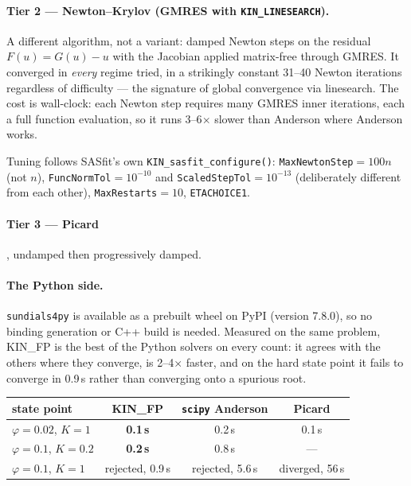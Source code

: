 \documentclass[11pt,a4paper]{article}
\newcommand{\code}[1]{\texttt{#1}}
\begin{document}
\paragraph{Tier 2 --- Newton--Krylov (GMRES with \code{KIN\_LINESEARCH}).}
A different algorithm, not a variant: damped Newton steps on the residual
$F(u)=G(u)-u$ with the Jacobian applied matrix-free through GMRES. It
converged in \emph{every} regime tried, in a strikingly constant 31--40
Newton iterations regardless of difficulty --- the signature of global
convergence via linesearch. The cost is wall-clock: each Newton step requires
many GMRES inner iterations, each a full function evaluation, so it runs
3--6$\times$ slower than Anderson where Anderson works.

Tuning follows SASfit's own \code{KIN\_sasfit\_configure()}:
\code{MaxNewtonStep}$=100n$ (not $n$), \code{FuncNormTol}$=10^{-10}$ and
\code{ScaledStepTol}$=10^{-13}$ (deliberately different from each other),
\code{MaxRestarts}$=10$, \code{ETACHOICE1}.

\paragraph{Tier 3 --- Picard}, undamped then progressively damped.

\paragraph{The Python side.} \code{sundials4py} is available as a prebuilt
wheel on PyPI (version 7.8.0), so no binding generation or C++ build is
needed. Measured on the same problem, KIN\_FP is the best of the Python
solvers on every count: it agrees with the others where they converge, is
2--4$\times$ faster, and on the hard state point it fails to converge in
0.9\,s rather than converging onto a spurious root.

\begin{center}
\begin{tabular}{lccc}
\toprule
state point & KIN\_FP & \code{scipy} Anderson & Picard\\
\midrule
$\varphi=0.02$, $K=1$ & \textbf{0.1\,s} & 0.2\,s & 0.1\,s\\
$\varphi=0.1$, $K=0.2$ & \textbf{0.2\,s} & 0.8\,s & ---\\
$\varphi=0.1$, $K=1$ & rejected, 0.9\,s & rejected, 5.6\,s & diverged, 56\,s\\
\bottomrule
\end{tabular}
\end{center}
\end{document}
